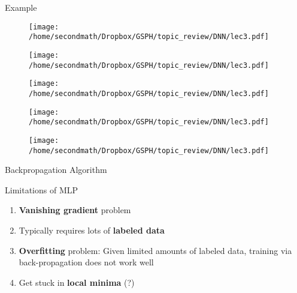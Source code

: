 \documentclass{beamer}
\begin{document}
\begin{frame}{Example\citep{perceptroncant}}
\begin{figure}
\centering
\texttt{[image: /home/secondmath/Dropbox/GSPH/topic\_review/DNN/lec3.pdf]}
\end{figure}
\end{frame}

\begin{frame}
\begin{figure}
\centering
\texttt{[image: /home/secondmath/Dropbox/GSPH/topic\_review/DNN/lec3.pdf]}
\end{figure}
\end{frame}

\begin{frame}
\begin{figure}
\centering
\texttt{[image: /home/secondmath/Dropbox/GSPH/topic\_review/DNN/lec3.pdf]}
\end{figure}
\end{frame}

\begin{frame}
\begin{figure}
\centering
\texttt{[image: /home/secondmath/Dropbox/GSPH/topic\_review/DNN/lec3.pdf]}
\end{figure}
\end{frame}

\begin{frame}
\begin{figure}
\centering
\texttt{[image: /home/secondmath/Dropbox/GSPH/topic\_review/DNN/lec3.pdf]}
\end{figure}
\end{frame}

\begin{frame}{Backpropagation Algorithm\citep{kimjunmoppt}}
\begin{figure}
\end{figure}
\end{frame}

\begin{frame}{Limitations of MLP\citep{kimjunmoppt}}
\begin{enumerate}
\item \textbf{Vanishing gradient} problem
\item Typically requires lots of \textbf{labeled data}
\item \textbf{Overfitting} problem: Given limited amounts of labeled data, training via back-propagation does not work well
\item Get stuck in \textbf{local minima} (?)
\end{enumerate} 
\end{frame}
\end{document}
